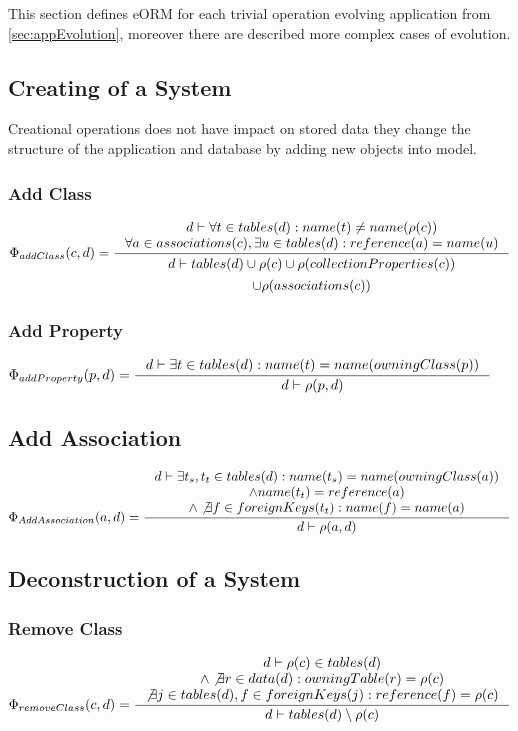 \documentclass[11pt]{article}
\begin{document}
This section defines eORM for each trivial operation evolving application from \ref{sec:appEvolution}, moreover there are described more complex cases of evolution. 
 
\subsection{Creating of a System}
Creational operations does not have impact on stored data they change the structure of the application and database by adding new objects into model.

\subsubsection{Add Class}

$
\Phi_{addClass}(c, d) = \inference{d \vdash \forall t \in tables(d) : name(t) \neq name(\rho(c)) \\
	\forall a \in associations(c), \exists u \in  tables(d) : reference(a) = name(u) 
}{
\begin{gathered}
d \vdash  tables(d) \cup \rho(c) \cup \rho(collectionProperties(c)) \\ \cup \rho(associations(c))
\end{gathered}
}
$
\subsubsection{Add Property}
$
\Phi_{addProperty}(p, d) = 
\inference{d \vdash \exists t \in tables(d) : name(t) = name(owningClass(p))}{d \vdash \rho(p,d)} 
$
\subsection{Add Association}
$
\Phi_{AddAssociation}(a, d) = \inference{d \vdash \exists t_s, t_t \in tables(d) : name(t_s) = name(owningClass(a)) \\ \wedge name(t_t) = reference(a) \\ \wedge \not \exists f \in foreignKeys(t_t) : name(f) = name(a) }{d \vdash \rho(a,d)}
$


\subsection{Deconstruction of a System}
\subsubsection{Remove Class}
$
\Phi_{removeClass}(c,d) = \inference{d \vdash \rho(c) \in tables(d) \\ \wedge \not \exists r \in data(d) : owningTable(r) = \rho(c) \\ \not \exists j \in tables(d), f \in foreignKeys(j) : reference(f) = \rho(c)  }{d \vdash tables(d) \setminus \rho(c)}
$
\end{document}
